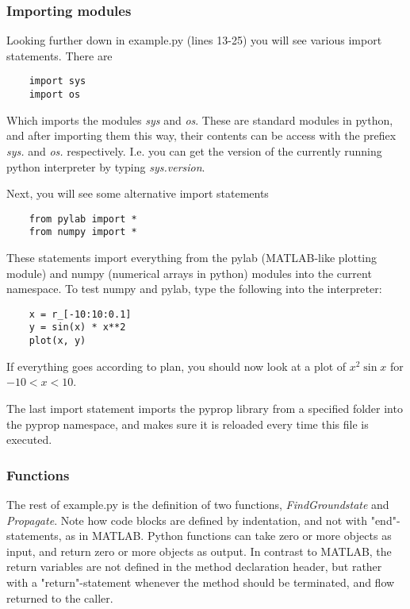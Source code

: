 \subsubsection*{Importing modules}
Looking further down in example.py (lines 13-25) you will see various import statements. There are
\begin{verbatim}
	import sys
	import os
\end{verbatim}
Which imports the modules \textit{sys} and \textit{os}. These are standard modules in python, and after importing them this
way, their contents can be access with the prefiex \textit{sys.} and \textit{os.} respectively. I.e. you can get the version
of the currently running python interpreter by typing \textit{sys.version}.

Next, you will see some alternative import statements
\begin{verbatim}
	from pylab import *
	from numpy import *
\end{verbatim}
These statements import everything from the pylab (MATLAB-like plotting module) and numpy (numerical arrays in python)
modules into the current namespace. To test numpy and pylab, type the following into the interpreter:
\begin{verbatim}
	x = r_[-10:10:0.1]
	y = sin(x) * x**2
	plot(x, y)
\end{verbatim}
If everything goes according to plan, you should now look at a plot of $x^2 \sin x $ for $-10 < x < 10$.

The last import statement imports the pyprop library from a specified folder into the pyprop namespace, and makes sure 
it is reloaded every time this file is executed.

\subsubsection*{Functions}
The rest of example.py is the definition of two functions, \textit{FindGroundstate} and \textit{Propagate}. 
Note how code blocks are defined by indentation, and not with "end"-statements, as in MATLAB. 
Python functions can take zero or more objects
as input, and return zero or more objects as output. In contrast to MATLAB, the return variables are not defined in the
method declaration header, but rather with a "return"-statement whenever the method should be terminated, and flow returned
to the caller. 

